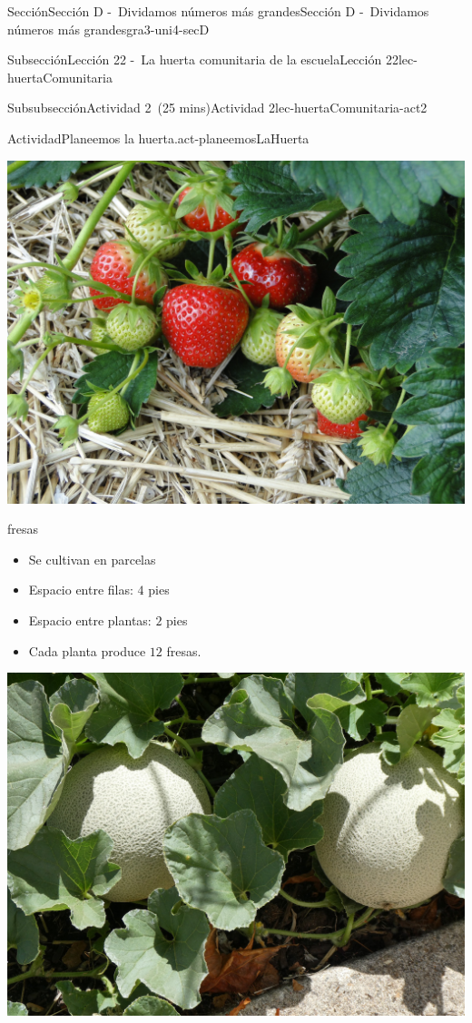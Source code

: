 \documentclass[oneside,10pt,]{article}
\begin{document}
\begin{sectionptx}{Sección}{Sección D -~Dividamos números más grandes}{}{Sección D -~Dividamos números más grandes}{}{}{gra3-uni4-secD}
\begin{subsectionptx}{Subsección}{Lección 22 -~La huerta comunitaria de la escuela}{}{Lección 22}{}{}{lec-huertaComunitaria}
\begin{subsubsectionptx}{Subsubsección}{Actividad 2~(25 mins)}{}{Actividad 2}{}{}{lec-huertaComunitaria-act2}
\begin{activity}{Actividad}{Planeemos la huerta.}{act-planeemosLaHuerta}
\begin{sidebyside}{2}{0.025}{0.025}{0.05}
\begin{sbspanel}{0.45}
\includegraphics[width=\linewidth]{external/jpg-source/3-4-D-22 Act1-Fresas.jpg}
%
\par
fresas%
%
\begin{itemize}[label=\textbullet]
\item{}Se cultivan en parcelas%
\item{}Espacio entre filas: \(4\) pies%
\item{}Espacio entre plantas: \(2\) pies%
\item{}Cada planta produce \(12\) fresas.%
\end{itemize}
\end{sbspanel}%
\begin{sbspanel}{0.45}%
\includegraphics[width=\linewidth]{external/jpg-source/3-4-D-22 Act2-melon-cantalupo.jpg}

\end{sbspanel}
\end{sidebyside}
\end{activity}
\end{subsubsectionptx}
\end{subsectionptx}
\end{sectionptx}
\end{document}
